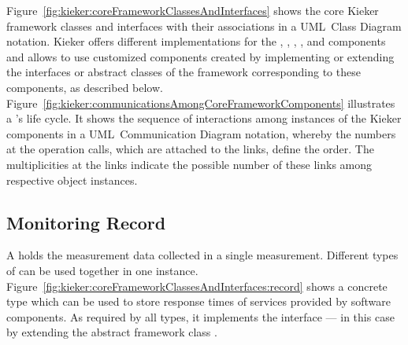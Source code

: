 % 
% 
Figure~\ref{fig:kieker:coreFrameworkClassesAndInterfaces} shows the core
Kieker framework classes and interfaces with their associations in a UML~Class %
Diagram notation. %
Kieker offers different implementations for the \MonitoringRecord{}, %
\MonitoringProbe{}, \MonitoringLogWriter{}, %
\MonitoringLogReader{}, and \MonitoringRecordConsumer{} %
components and allows to use customized components created by implementing or %
extending the interfaces or abstract classes of the framework corresponding to these components, as described below.
% 
% 
Figure~\ref{fig:kieker:communicationsAmongCoreFrameworkComponents} illustrates a \MonitoringRecord{}'s life cycle. It shows the
sequence of interactions among instances of the
Kieker components in a UML~Communication Diagram
notation, whereby the numbers at the operation calls, which are attached to the links, define the order. The multiplicities at the links indicate the possible number of these links among respective object instances.





\subsection{Monitoring Record}\label{sec:architecture:record}

\noindent A \MonitoringRecord{} holds the measurement data collected in a single measurement. %
Different types of \MonitoringRecords{} can be used together in one \KiekerTpmon{} %
instance. %
Figure~\ref{fig:kieker:coreFrameworkClassesAndInterfaces:record} shows a %
concrete \MonitoringRecord{} type  which can be used %
to store response times of services provided by software components. %
As required by all \MonitoringRecord{} types, it implements the interface ---%
in this case by extending the abstract framework class . %

